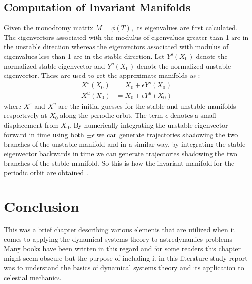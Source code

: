 \subsection{Computation of Invariant Manifolds}
Given the monodromy matrix $M = \phi(T)$, its eigenvalues are first calculated. The eigenvectors associated with the modulus of eigenvalues greater than 1 are in the unstable direction whereas the eigenvectors associated with modulus of eigenvalues less than 1 are in the stable direction. Let $Y^s (X_0)$ denote the normalized stable eigenvector and $Y^u (X_0)$ denote the normalized unstable eigenvector. These are used to get the approximate manifolds as \cite{invariant}:
\begin{equation}
\begin{aligned}
X^s (X_0) &= X_0 + \epsilon Y^s (X_0) \\
X^u (X_0) &= X_0 + \epsilon Y^u (X_0)
\end{aligned}
\end{equation}
%
where $X^s$ and $X^u$ are the initial guesses for the stable and unstable manifolds respectively at $X_0$ along the periodic orbit. The term $\epsilon$ denotes a small displacement from $X_0$. By numerically integrating the unstable eigenvector forward in time using both $\pm \epsilon$ we can generate trajectories shadowing the two branches of the unstable manifold and in a similar way, by integrating the stable eigenvector backwards in time we can generate trajectories shadowing the two branches of the stable manifold. So this is how the invariant manifold for the periodic orbit are obtained \cite{invariant}.

\section{Conclusion}
This was a brief chapter describing various elements that are utilized when it comes to applying the dynamical systems theory to astrodynamics problems. Many books have been written in this regard and for some readers this chapter might seem obscure but the purpose of including it in this literature study report was to understand the basics of dynamical systems theory and its application to celestial mechanics.
